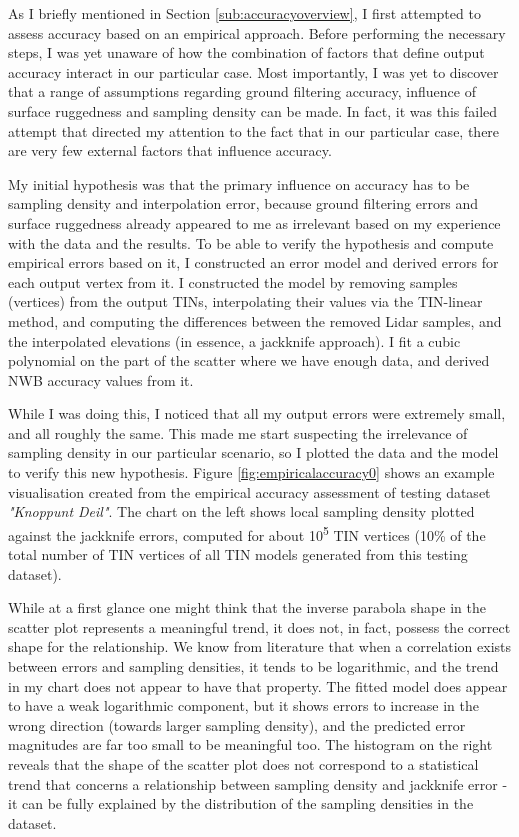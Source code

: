 As I briefly mentioned in Section \ref{sub:accuracyoverview}, I first attempted to assess accuracy based on an empirical approach. Before performing the necessary steps, I was yet unaware of how the combination of factors that define output accuracy interact in our particular case. Most importantly, I was yet to discover that a range of assumptions regarding ground filtering accuracy, influence of surface ruggedness and sampling density can be made. In fact, it was this failed attempt that directed my attention to the fact that in our particular case, there are very few external factors that influence accuracy.

My initial hypothesis was that the primary influence on accuracy has to be sampling density and interpolation error, because ground filtering errors and surface ruggedness already appeared to me as irrelevant based on my experience with the data and the results. To be able to verify the hypothesis and compute empirical errors based on it, I constructed an error model and derived errors for each output vertex from it. I constructed the model by removing samples (vertices) from the output TINs, interpolating their values via the TIN-linear method, and computing the differences between the removed Lidar samples, and the interpolated elevations (in essence, a jackknife approach). I fit a cubic polynomial on the part of the scatter where we have enough data, and derived NWB accuracy values from it.

While I was doing this, I noticed that all my output errors were extremely small, and all roughly the same. This made me start suspecting the irrelevance of sampling density in our particular scenario, so I plotted the data and the model to verify this new hypothesis. Figure \ref{fig:empiricalaccuracy0} shows an example visualisation created from the empirical accuracy assessment of testing dataset \textit{"Knoppunt Deil"}. The chart on the left shows local sampling density plotted against the jackknife errors, computed for about 10\textsuperscript{5} TIN vertices (10\% of the total number of TIN vertices of all TIN models generated from this testing dataset).

While at a first glance one might think that the inverse parabola shape in the scatter plot represents a meaningful trend, it does not, in fact, possess the correct shape for the relationship. We know from literature that when a correlation exists between errors and sampling densities, it tends to be logarithmic, and the trend in my chart does not appear to have that property. The fitted model does appear to have a weak logarithmic component, but it shows errors to increase in the wrong direction (towards larger sampling density), and the predicted error magnitudes are far too small to be meaningful too. The histogram on the right reveals that the shape of the scatter plot does not correspond to a statistical trend that concerns a relationship between sampling density and jackknife error - it can be fully explained by the distribution of the sampling densities in the dataset.

